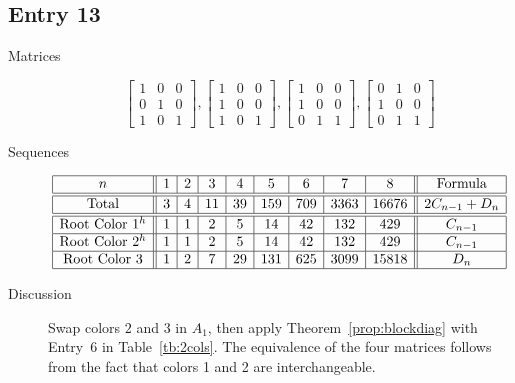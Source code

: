 \documentclass[12pt]{amsart}
\begin{document}
\subsection*{Entry 13}
\begin{description}
    \item[Matrices]
    
    \[\begin{bmatrix}
1 & 0 & 0 \\
0 & 1 & 0 \\
1 & 0 & 1
\end{bmatrix}, \begin{bmatrix}
1 & 0 & 0 \\
1 & 0 & 0 \\
1 & 0 & 1
\end{bmatrix}, \begin{bmatrix}
1 & 0 & 0 \\
1 & 0 & 0 \\
0 & 1 & 1
\end{bmatrix}, \begin{bmatrix}
0 & 1 & 0 \\
1 & 0 & 0 \\
0 & 1 & 1
\end{bmatrix}\]
    \item[Sequences]\hspace*{\fill}\vspace{-0.5cm}
    \begin{center}
        \[
        \begin{array}{|c||c|c|c|c|c|c|c|c||c|}\hline
           n  & 1 & 2 & 3 & 4 & 5 & 6 & 7 & 8  & \text{Formula}\\\hline\hline
           \text{Total}  & 3 & 4 & 11 & 39 & 159 & 709 & 3363 & 16676 & 2C_{n-1} + D_{n}\\\hline\hline
           \text{Root Color }1^{h} & 1 & 1 & 2 & 5 & 14 & 42 & 132 & 429 & C_{n-1}\\\hline
           \text{Root Color }2^{h} & 1 & 1 & 2 & 5 & 14 & 42 & 132 & 429 & C_{n-1}\\\hline
           \text{Root Color }3 & 1 & 2 & 7 & 29 & 131 & 625 & 3099 & 15818 & D_n\\\hline
        \end{array}
        \]
    \end{center}
    
    \item[Discussion] 
    Swap colors $2$ and $3$ in $A_1$, then apply Theorem~\ref{prop:blockdiag} with Entry~6 in Table~\ref{tb:2cols}. The equivalence of the four matrices follows from the fact that colors 1 and 2 are interchangeable.
\end{description}
\end{document}
